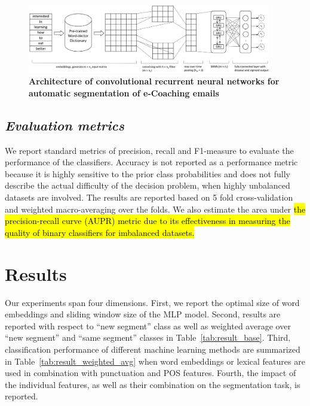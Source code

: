 \documentclass{amia}
\begin{document}
\begin{figure}[!htb]
    \centering
    \includegraphics[width=0.95\textwidth]{figures/CRNN.eps}
    \caption{\textbf{Architecture of convolutional recurrent neural networks for automatic segmentation of e-Coaching emails}}
    \label{fig:crnn}
\end{figure}
  
\subsection*{\textit{Evaluation metrics}}
We report standard metrics of precision, recall and F1-measure to evaluate the performance of the classifiers.\cite{aas1999text} Accuracy is not reported as a performance metric because it is highly sensitive to the prior class probabilities and does not fully describe the actual difficulty of the decision problem, when highly unbalanced datasets are involved. The results are reported based on 5 fold cross-validation and weighted macro-averaging over the folds. We also estimate the area under \hl{the precision-recall curve (AUPR) metric due to its effectiveness in measuring the quality of binary classifiers for imbalanced datasets.} \cite{davis2006relationship}

\section*{Results}
Our experiments span four dimensions. First, we report the optimal size of word embeddings and sliding window size of the MLP model. Second, results are reported with respect to ``new segment'' class as well as weighted average over ``new segment'' and ``same segment'' classes in Table~\ref{tab:result_base}. Third, classification performance of different machine learning methods are summarized in Table~\ref{tab:result_weighted_avg} when word embeddings or lexical features are used in combination with punctuation and POS features. Fourth, the impact of the individual features, as well as their combination on the segmentation task, is reported.
\end{document}
